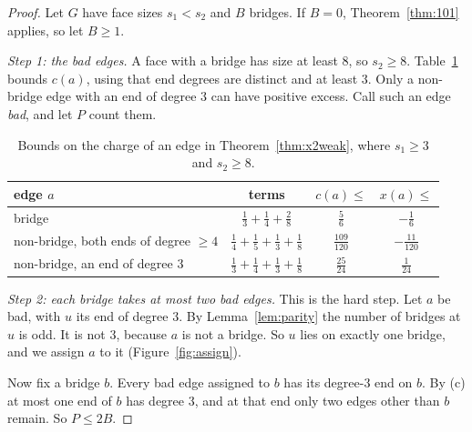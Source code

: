 \documentclass{amsart}
\theoremstyle{plain}
\theoremstyle{definition}
\theoremstyle{remark}
\begin{document}
\begin{proof}
Let $G$ have face sizes $s_1 < s_2$ and $B$ bridges. If $B=0$,
Theorem~\ref{thm:101} applies, so let $B \ge 1$.

\smallskip
\emph{Step 1: the bad edges.} A face with a bridge has size at least $8$, so
$s_2 \ge 8$. Table~\ref{tab:cases} bounds $c(a)$, using that end degrees are
distinct and at least $3$. Only a non-bridge edge with an end of degree $3$ can
have positive excess. Call such an edge \emph{bad}, and let $P$ count them.

\begin{table}[ht]
\centering
\small
\begin{tabular}{lccc}
\toprule
edge $a$ & terms & $c(a) \le$ & $x(a) \le$ \\
\midrule
bridge
 & $\tfrac13+\tfrac14 + \tfrac28$
 & $\tfrac56$ & $-\tfrac16$ \\[2pt]
non-bridge, both ends of degree $\ge 4$
 & $\tfrac14+\tfrac15 + \tfrac13+\tfrac18$
 & $\tfrac{109}{120}$ & $-\tfrac{11}{120}$ \\[2pt]
non-bridge, an end of degree $3$
 & $\tfrac13+\tfrac14 + \tfrac13+\tfrac18$
 & $\tfrac{25}{24}$ & $\tfrac1{24}$ \\
\bottomrule
\end{tabular}
\caption{Bounds on the charge of an edge in Theorem~\ref{thm:x2weak}, where
$s_1 \ge 3$ and $s_2 \ge 8$.}\label{tab:cases}
\end{table}

\smallskip
\emph{Step 2: each bridge takes at most two bad edges.} This is the hard step.
Let $a$ be bad, with $u$ its end of degree $3$. By Lemma~\ref{lem:parity} the
number of bridges at $u$ is odd. It is not $3$, because $a$ is not a bridge. So
$u$ lies on exactly one bridge, and we assign $a$ to it
(Figure~\ref{fig:assign}).

Now fix a bridge $b$. Every bad edge assigned to $b$ has its degree-$3$ end on
$b$. By (c) at most one end of $b$ has degree $3$, and at that end only two
edges other than $b$ remain. So $P \le 2B$.


\end{proof}
\end{document}
